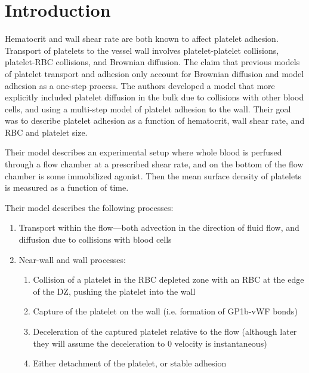 \documentclass[
10pt, %
letterpaper, %
twocolumn, %
landscape %
]{article}
\begin{document}
\pagestyle{myheadings} %
\markright{\doctitle} %


\thispagestyle{plain} %

\printtitle %


\section{Introduction}

Hematocrit and wall shear rate are both known to affect platelet
adhesion. Transport of platelets to the vessel wall involves
platelet-platelet collisions, platelet-RBC collisions, and Brownian
diffusion. The claim that previous models of platelet transport and
adhesion only account for Brownian diffusion and model adhesion as a
one-step process. The authors developed a model that more explicitly
included platelet diffusion in the bulk due to collisions with other
blood cells, and using a multi-step model of platelet adhesion to the
wall. Their goal was to describe platelet adhesion as a function of
hematocrit, wall shear rate, and RBC and platelet size.

Their model describes an experimental setup where whole blood is
perfused through a flow chamber at a prescribed shear rate, and on the
bottom of the flow chamber is some immobilized agonist. Then the mean
surface density of platelets is measured as a function of time.

Their model describes the following processes:
\begin{enumerate}
\item Transport within the flow---both advection in the direction of
  fluid flow, and diffusion due to collisions with blood cells
\item Near-wall and wall processes:
  \begin{enumerate}
  \item Collision of a platelet in the RBC depleted zone with an RBC
    at the edge of the DZ, pushing the platelet into the wall
  \item Capture of the platelet on the wall (i.e. formation of
    GP1b-vWF bonds)
  \item Deceleration of the captured platelet relative to the flow
    (although later they will assume the deceleration to 0 velocity is
    instantaneous)
  \item Either detachment of the platelet, or stable adhesion
  \end{enumerate}
\end{enumerate}
\end{document}
